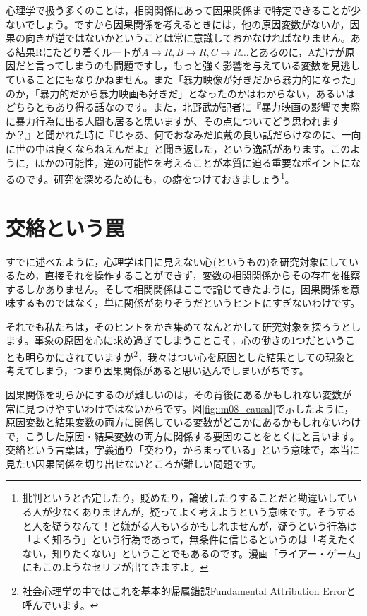 \documentclass{ltjbook}
\begin{document}
心理学で扱う多くのことは，相関関係にあって因果関係まで特定できることが少ないでしょう。ですから因果関係を考えるときには，他の原因変数がないか，因果の向きが逆ではないかということは常に意識しておかなければなりません。ある結果Rにたどり着くルートが$A \to R, B\to R, C\to R \ldots$とあるのに，Aだけが原因だと言ってしまうのも問題ですし，もっと強く影響を与えている変数を見逃していることにもなりかねません。また「暴力映像が好きだから暴力的になった」のか，「暴力的だから暴力映画も好きだ」となったのかはわからない，あるいはどちらともあり得る話なのです。また，北野武が記者に『暴力映画の影響で実際に暴力行為に出る人間も居ると思いますが、その点についてどう思われますか？』と聞かれた時に『じゃあ、何でおなみだ頂戴の良い話だらけなのに、一向に世の中は良くならねえんだよ』と聞き返した，という逸話があります。このように，ほかの可能性，逆の可能性を考えることが本質に迫る重要なポイントになるのです。研究を深めるためにも，の癖をつけておきましょう\footnote{批判というと否定したり，貶めたり，論破したりすることだと勘違いしている人が少なくありませんが，疑ってよく考えようという意味です。そうすると人を疑うなんて！と嫌がる人もいるかもしれませんが，疑うという行為は「よく知ろう」という行為であって，無条件に信じるというのは「考えたくない，知りたくない」ということでもあるのです。漫画「ライアー・ゲーム」にもこのようなセリフが出てきますよ。}。

\section{交絡という罠}
\label{confounding}
すでに述べたように，心理学は目に見えない心(というもの)を研究対象にしているため，直接それを操作することができず，変数の相関関係からその存在を推察するしかありません。そして相関関係はここで論じてきたように，因果関係を意味するものではなく，単に関係がありそうだというヒントにすぎないわけです。

それでも私たちは，そのヒントをかき集めてなんとかして研究対象を探ろうとします。事象の原因を心に求め過ぎてしまうことこそ，心の働きの1つだということも明らかにされていますが\footnote{社会心理学の中ではこれを基本的帰属錯誤Fundamental Attribution Errorと呼んでいます。}，我々はつい心を原因とした結果としての現象と考えてしまう，つまり因果関係があると思い込んでしまいがちです。

因果関係を明らかにするのが難しいのは，その背後にあるかもしれない変数が常に見つけやすいわけではないからです。図\ref{fig::m08_causal}で示したように，原因変数と結果変数の両方に関係している変数がどこかにあるかもしれないわけで，こうした原因・結果変数の両方に関係する要因のことをとくにと言います。交絡という言葉は，字義通り「交わり，からまっている」という意味で，本当に見たい因果関係を切り出せないところが難しい問題です。
\end{document}
